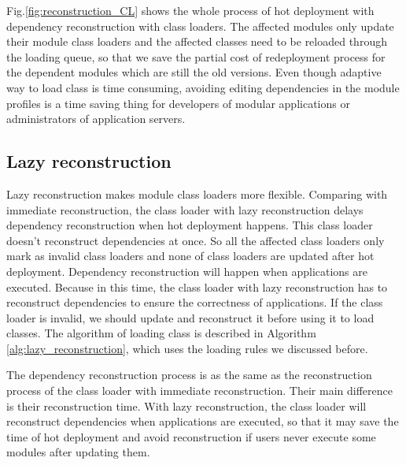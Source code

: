 \documentclass[conference]{IEEEtran}
\begin{document}
Fig.\ref{fig:reconstruction_CL} shows the whole process of hot deployment with dependency reconstruction with class loaders. 
The affected modules only update their module class loaders and the affected classes need to be reloaded through the loading queue, so that we save the partial cost of redeployment process for the dependent modules which are still the old versions. 
Even though adaptive way to load class is time consuming, avoiding editing dependencies in the module profiles is a time saving thing for developers of modular applications or administrators of application servers.


\subsection{Lazy reconstruction}

Lazy reconstruction makes module class loaders more flexible.
Comparing with immediate reconstruction, the class loader with lazy reconstruction delays dependency reconstruction when hot deployment happens.
This class loader doesn't reconstruct dependencies at once. 
So all the affected class loaders only mark as invalid class loaders and none of class loaders are updated after hot deployment.
Dependency reconstruction will happen when applications are executed.
Because in this time, the class loader with lazy reconstruction has to reconstruct dependencies to ensure the correctness of applications.
If the class loader is invalid, we should update and reconstruct it before using it to load classes. 
The algorithm of loading class is described in Algorithm \ref{alg:lazy_reconstruction}, which uses the loading rules we discussed before.

The dependency reconstruction process is as the same as the reconstruction process of the class loader with immediate reconstruction.
Their main difference is their reconstruction time.
With lazy reconstruction, the class loader will reconstruct dependencies when applications are executed, so that it may save the time of hot deployment and avoid reconstruction if users never execute some modules after updating them.
\end{document}
